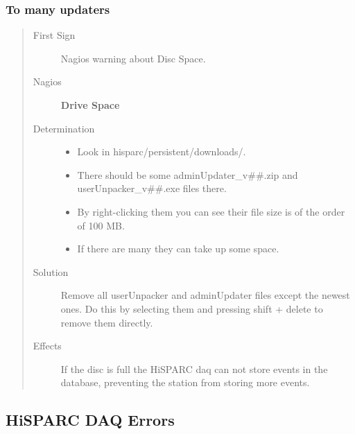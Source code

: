 \documentclass[a4paper,11pt,english]{sphinxmanual}
\begin{document}
\subsubsection{To many updaters}
\label{known-issues:to-many-updaters}\begin{quote}\begin{description}
\item[{First Sign}] \leavevmode
Nagios warning about Disc Space.

\item[{Nagios}] \leavevmode
\textbf{Drive Space}

\item[{Determination}] \leavevmode\begin{itemize}
\item {} 
Look in hisparc/persistent/downloads/.

\item {} 
There should be some adminUpdater\_v\#\#.zip and userUnpacker\_v\#\#.exe files there.

\item {} 
By right-clicking them you can see their file size is of the order of 100 MB.

\item {} 
If there are many they can take up some space.

\end{itemize}

\item[{Solution}] \leavevmode
Remove all userUnpacker and adminUpdater files except the newest ones. Do this by selecting them and pressing shift + delete to remove them directly.

\item[{Effects}] \leavevmode
If the disc is full the HiSPARC daq can not store events in the database, preventing the station from storing more events.

\end{description}\end{quote}


\subsection{HiSPARC DAQ Errors}
\label{known-issues:hisparc-daq-errors}
\end{document}
